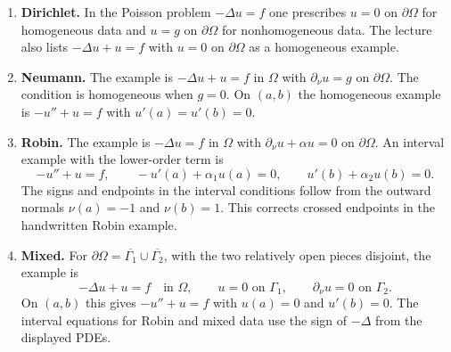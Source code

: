 \documentclass[11pt,a4paper]{article}
\begin{document}
\begin{enumerate}
  \item \textbf{Dirichlet.}
    In the Poisson problem \(-\Delta u=f\) one prescribes
    \(u=0\) on \(\partial\Omega\) for homogeneous data and
    \(u=g\) on \(\partial\Omega\) for nonhomogeneous data.
    The lecture also lists \(-\Delta u+u=f\) with
    \(u=0\) on \(\partial\Omega\) as a homogeneous example.
  \item \textbf{Neumann.}
    The example is \(-\Delta u+u=f\) in \(\Omega\) with
    \(\partial_\nu u=g\) on \(\partial\Omega\). The condition is
    homogeneous when \(g=0\). On \((a,b)\) the homogeneous
    example is \(-u''+u=f\) with \(u'(a)=u'(b)=0\).
  \item \textbf{Robin.}
    The example is \(-\Delta u=f\) in \(\Omega\) with
    \(\partial_\nu u+\alpha u=0\) on \(\partial\Omega\).
    An interval example with the lower-order term is
    \[
      -u''+u=f,\qquad
      -u'(a)+\alpha_1u(a)=0,\qquad
      u'(b)+\alpha_2u(b)=0 .
    \]
    The signs and endpoints in the interval conditions follow
    from the outward normals \(\nu(a)=-1\) and \(\nu(b)=1\).
    This corrects crossed endpoints in the handwritten
    Robin example.
  \item \textbf{Mixed.}
    For \(\partial\Omega=\overline{\Gamma_1}\cup
    \overline{\Gamma_2}\), with the two relatively open pieces
    disjoint, the example is
    \[
      -\Delta u+u=f\quad\text{in }\Omega,\qquad
      u=0\text{ on }\Gamma_1,\qquad
      \partial_\nu u=0\text{ on }\Gamma_2 .
    \]
    On \((a,b)\) this gives \(-u''+u=f\) with \(u(a)=0\)
    and \(u'(b)=0\). The interval equations for Robin and mixed
    data use the sign of \(-\Delta\) from the displayed PDEs.
\end{enumerate}

\begin{center}
\end{center}
\end{document}
